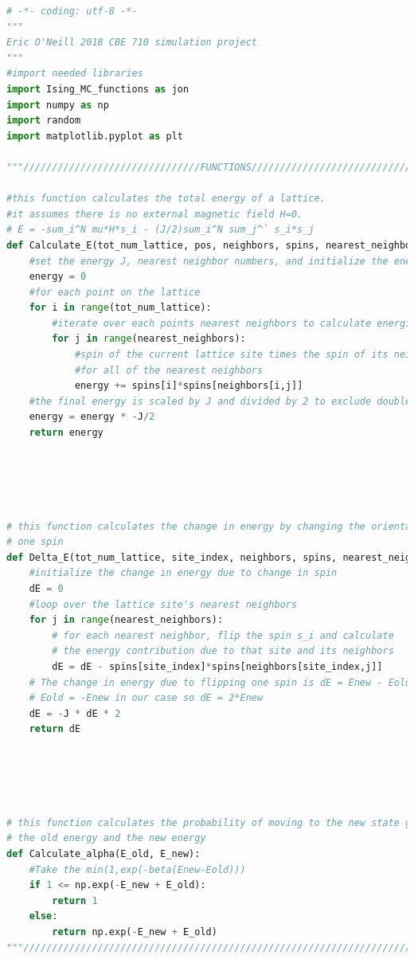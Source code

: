 \documentclass{article}
\begin{document}
\begin{lstlisting}[language=Python]
# -*- coding: utf-8 -*-
"""
Eric O'Neill 2018 CBE 710 simulation project
"""
#import needed libraries
import Ising_MC_functions as jon
import numpy as np
import random
import matplotlib.pyplot as plt

"""///////////////////////////////FUNCTIONS/////////////////////////////////"""

#this function calculates the total energy of a lattice.
#it assumes there is no external magnetic field H=0.
# E = -sum_i^N mu*H*s_i - (J/2)sum_i^N sum_j^` s_i*s_j
def Calculate_E(tot_num_lattice, pos, neighbors, spins, nearest_neighbors, J):
    #set the energy J, nearest neighbor numbers, and initialize the energy
    energy = 0
    #for each point on the lattice 
    for i in range(tot_num_lattice):
        #iterate over each points nearest neighbors to calculate energies
        for j in range(nearest_neighbors):
            #spin of the current lattice site times the spin of its neighbor
            #for all of the nearest neighbors
            energy += spins[i]*spins[neighbors[i,j]]
    #the final energy is scaled by J and divided by 2 to exclude double counting
    energy = energy * -J/2
    return energy





# this function calculates the change in energy by changing the orientation of 
# one spin
def Delta_E(tot_num_lattice, site_index, neighbors, spins, nearest_neighbors, J):
    #initialize the change in energy due to change in spin
    dE = 0
    #loop over the lattice site's nearest neighbors
    for j in range(nearest_neighbors):
        # for each nearest neighbor, flip the spin s_i and calculate 
        # the energy contribution due to that site and its neighbors
        dE = dE - spins[site_index]*spins[neighbors[site_index,j]]
    # The change in energy due to flipping one spin is dE = Enew - Eold
    # Eold = -Enew in our case so dE = 2*Enew    
    dE = -J * dE * 2
    return dE





# this function calculates the probability of moving to the new state given 
# the old energy and the new energy
def Calculate_alpha(E_old, E_new):
    #Take the min(1,exp(-beta(Enew-Eold)))
    if 1 <= np.exp(-E_new + E_old):
        return 1
    else:
        return np.exp(-E_new + E_old)
"""/////////////////////////////////////////////////////////////////////////"""





\end{lstlisting}
\end{document}
